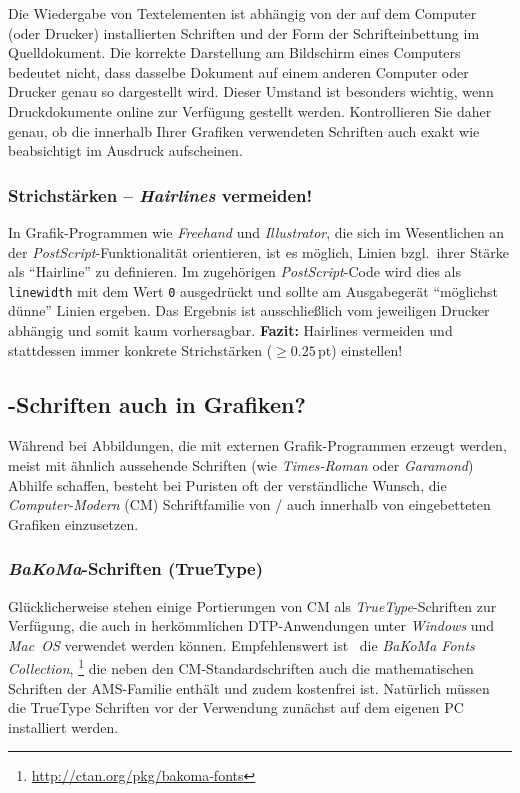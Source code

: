 Die Wiedergabe von Textelementen ist abhängig von der auf dem
Computer (oder Drucker) installierten Schriften und der Form der
Schrifteinbettung im Quelldokument. Die korrekte Darstellung am
Bildschirm eines Computers bedeutet nicht, dass dasselbe Dokument
auf einem anderen Computer oder Drucker genau so dargestellt wird.
Dieser Umstand ist besonders wichtig, wenn Druckdokumente online
zur Verfügung gestellt werden. Kontrollieren Sie daher genau, ob
die innerhalb Ihrer Grafiken verwendeten Schriften auch exakt wie
beabsichtigt im Ausdruck aufscheinen.


\subsubsection{Strichstärken -- \emph{Hairlines} vermeiden!}

In Grafik-Programmen wie \emph{Freehand} und \emph{Illustrator},
die sich im Wesentlichen an der \emph{PostScript}-Funktionalität
orientieren, ist es möglich, Linien bzgl.\ ihrer Stärke als
"`Hairline"' zu definieren. Im zugehörigen \emph{PostScript}-Code
wird dies als \texttt{linewidth} mit dem Wert \texttt{0} ausgedrückt und
sollte am Ausgabegerät "`möglichst dünne"' Linien ergeben. 
Das Ergebnis ist ausschließlich vom jeweiligen Drucker
abhängig und somit kaum vorhersagbar.
\textbf{Fazit:} Hairlines vermeiden und stattdessen immer konkrete
Strichstärken ($\geq 0.25\,\mathrm{pt}$) einstellen!





\subsection{\tex-Schriften auch in Grafiken?}
\label{sec:tex-schriften-in-grafiken}

Während bei Abbildungen, die mit externen
Grafik-Programmen erzeugt werden, meist mit ähnlich aussehende
Schriften (wie \emph{Times-Roman} oder \emph{Garamond}) Abhilfe schaffen,
besteht bei Puristen oft der verständliche Wunsch, die 
\emph{Computer-Modern} (CM) Schriftfamilie von {\tex}/{\latex} auch
innerhalb von eingebetteten Grafiken einzusetzen.

\subsubsection{\emph{BaKoMa}-Schriften (TrueType)}

Glücklicherweise stehen einige Portierungen von CM als {\em
TrueType}-Schriften zur Verfügung, die auch in herkömmlichen
DTP-Anwendungen unter \emph{Windows} und \emph{Mac~OS} verwendet werden
können. Empfehlenswert ist \zB\ die \emph{BaKoMa Fonts Collection},%
\footnote{\url{http://ctan.org/pkg/bakoma-fonts}}
die neben den CM-Standardschriften auch die mathematischen Schriften
der AMS-Familie ent\-hält und zudem kostenfrei ist. Natürlich
müssen die TrueType Schriften vor der Verwendung zunächst auf dem
eigenen PC installiert werden. 


